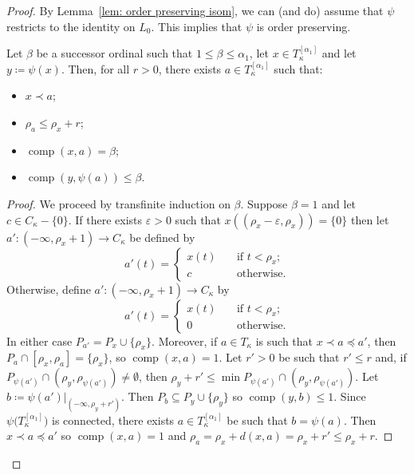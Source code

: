 \documentclass[10pt,a4paper]{amsart}
\DeclareMathOperator{\comp}{comp}
\begin{document}
\begin{proof}
	By Lemma~\ref{lem: order preserving isom}, we can (and do) assume that $\psi$ restricts to the identity on $L_0$. This implies that $\psi$ is order preserving.

    \setcounter{claim}{0}
    \begin{claim}
     \label{claim: induction hyp}
    	Let $\beta$ be a successor ordinal such that $1 \leq \beta \leq \alpha_1$, let $x \in T_\kappa^{[\alpha_1]}$ and let $y \coloneqq \psi(x)$. Then, for all $r > 0$, there exists $a \in T_\kappa^{[\alpha_1]}$ such that:
    	\begin{itemize}
    		\item[i.] $x \prec a$;
    		\item[ii.] $\rho_a \leq \rho_x + r$;
    		\item[iii.] $\comp(x,a) = \beta$;
    		\item[iv.] $\comp(y, \psi(a)) \leq \beta$. 
    	\end{itemize}
    \end{claim}
    \begin{proof}
    	\renewcommand{\qedsymbol}{$\blacksquare$}
    	We proceed by transfinite induction on $\beta$. Suppose $\beta = 1$ and let $c \in C_\kappa - \{0\}$. If there exists $\varepsilon > 0$ such that $x((\rho_{x} - \varepsilon, \rho_{x})) = \{0\}$ then let $a': (-\infty, \rho_{x} + 1) \rightarrow C_\kappa$ be defined by 
    	\[
    	a'(t) =
    	\begin{cases}
    		x(t) \quad &\text{if } t < \rho_{x};\\
    		c &\text{otherwise.}
    	\end{cases}
    	\]
    	Otherwise, define $a': (-\infty, \rho_{x} + 1) \rightarrow C_\kappa$ by
    	\[ 
    	a'(t) =
    	\begin{cases}
    		x(t) \quad &\text{if } t < \rho_{x}; \\
    		0 &\text{otherwise.}
    	\end{cases}
    	\]
    	In either case $P_{a'} = P_{x} \cup \{\rho_{x}\}$. Moreover, if $a \in T_\kappa$ is such that $x \prec a \preceq a'$, then $P_{a} \cap [\rho_{x}, \rho_{a}] =\{\rho_{x}\}$, so $\comp(x, a) = 1$.
    	Let $r' > 0$ be such that $r' \leq r$ and, if $P_{\psi(a')} \cap (\rho_{y}, \rho_{\psi(a')}) \neq \emptyset$, then $\rho_{y} + r' \leq \min P_{\psi(a')} \cap (\rho_{y}, \rho_{\psi(a')})$.
    	Let $b \coloneqq \psi(a')|_{(-\infty, \rho_{y} + r')}$. Then $P_b \subseteq P_{y} \cup \{\rho_{y}\}$ so $\comp(y,b) \leq 1$.
    	Since $\psi\big(T_\kappa^{[\alpha_1]}\big)$ is connected, there exists $a \in T_\kappa^{[\alpha_1]}$ be such that $b = \psi(a)$. Then $x \prec a \preceq a'$ so $\comp(x, a) = 1$ and $\rho_{a} = \rho_{x} + d(x, a) = \rho_{x} + r' \leq \rho_{x} + r$.
    	

\end{proof}
\end{proof}
\end{document}
